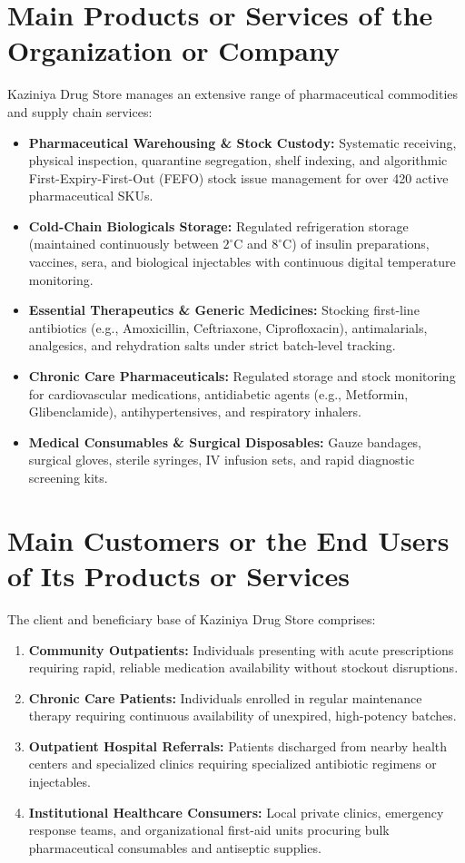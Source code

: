 \section{Main Products or Services of the Organization or Company}
Kaziniya Drug Store manages an extensive range of pharmaceutical commodities and supply chain services:
\begin{itemize}
    \item \textbf{Pharmaceutical Warehousing \& Stock Custody:} Systematic receiving, physical inspection, quarantine segregation, shelf indexing, and algorithmic First-Expiry-First-Out (FEFO) stock issue management for over 420 active pharmaceutical SKUs.
    \item \textbf{Cold-Chain Biologicals Storage:} Regulated refrigeration storage (maintained continuously between $2^\circ\text{C}$ and $8^\circ\text{C}$) of insulin preparations, vaccines, sera, and biological injectables with continuous digital temperature monitoring.
    \item \textbf{Essential Therapeutics \& Generic Medicines:} Stocking first-line antibiotics (e.g., Amoxicillin, Ceftriaxone, Ciprofloxacin), antimalarials, analgesics, and rehydration salts under strict batch-level tracking.
    \item \textbf{Chronic Care Pharmaceuticals:} Regulated storage and stock monitoring for cardiovascular medications, antidiabetic agents (e.g., Metformin, Glibenclamide), antihypertensives, and respiratory inhalers.
    \item \textbf{Medical Consumables \& Surgical Disposables:} Gauze bandages, surgical gloves, sterile syringes, IV infusion sets, and rapid diagnostic screening kits.
\end{itemize}

\section{Main Customers or the End Users of Its Products or Services}
The client and beneficiary base of Kaziniya Drug Store comprises:
\begin{enumerate}
    \item \textbf{Community Outpatients:} Individuals presenting with acute prescriptions requiring rapid, reliable medication availability without stockout disruptions.
    \item \textbf{Chronic Care Patients:} Individuals enrolled in regular maintenance therapy requiring continuous availability of unexpired, high-potency batches.
    \item \textbf{Outpatient Hospital Referrals:} Patients discharged from nearby health centers and specialized clinics requiring specialized antibiotic regimens or injectables.
    \item \textbf{Institutional Healthcare Consumers:} Local private clinics, emergency response teams, and organizational first-aid units procuring bulk pharmaceutical consumables and antiseptic supplies.
\end{enumerate}


